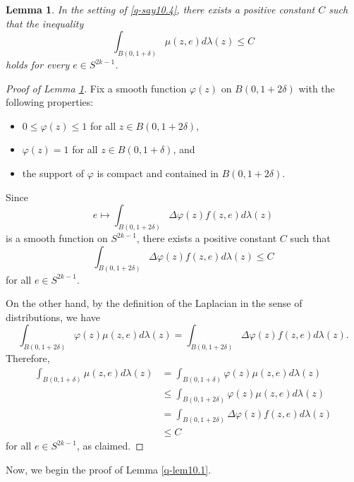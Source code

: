 \documentclass[12pt,twoside]{amsart}
\newtheorem{lem}[thm]{Lemma}
\theoremstyle{definition}
\begin{document}
\begin{lem}
\label{q-lem10.6}
In the setting of \ref{q-say10.4}, there exists a positive constant $C$
such that the inequality
\[
\int_{B(0,1+\delta)}\mu(z,e)d\lambda(z) \le C
\]
holds for every $e \in S^{2k-1}$.
\end{lem}
\begin{proof}[Proof of Lemma \ref{q-lem10.6}]
Fix a smooth function $\varphi(z)$ on $B(0,1+2\delta)$
with the following properties:
\begin{itemize}
\item
$0 \le \varphi(z) \le 1$ for all $z \in B(0,1+2\delta)$,
\item
$\varphi(z)=1$ for all $z \in B(0,1+\delta)$, and
\item
the support of $\varphi$ is compact and contained in $B(0,1+2\delta)$.
\end{itemize}
Since
\[
e \mapsto
\int_{B(0,1+2\delta)}\Delta\varphi(z) f(z,e) d\lambda(z)
\]
is a smooth function on $S^{2k-1}$,
there exists a positive constant $C$ such that
\[
\int_{B(0,1+2\delta)}\Delta\varphi(z) f(z,e) d\lambda(z) \le C
\]
for all $e \in S^{2k-1}$.

On the other hand,
by the definition of the Laplacian in the sense of distributions, 
we have
\[
\int_{B(0,1+2\delta)}\varphi(z) \mu(z,e)d\lambda(z)
=\int_{B(0,1+2\delta)}\Delta\varphi(z) f(z,e) d\lambda(z).
\]
Therefore, 
\begin{align*}
\int_{B(0,1+\delta)}\mu(z,e)d\lambda(z)
&=\int_{B(0,1+\delta)}\varphi(z)\mu(z,e)d\lambda(z) \\
&\le
\int_{B(0,1+2\delta)}\varphi(z)\mu(z,e)d\lambda(z) \\
&=\int_{B(0,1+2\delta)}\Delta\varphi(z) f(z,e) d\lambda(z) \\
&\le C
\end{align*}
for all $e \in S^{2k-1}$,  as claimed.
\end{proof}

Now, we begin the proof of Lemma \ref{q-lem10.1}.
\end{document}
